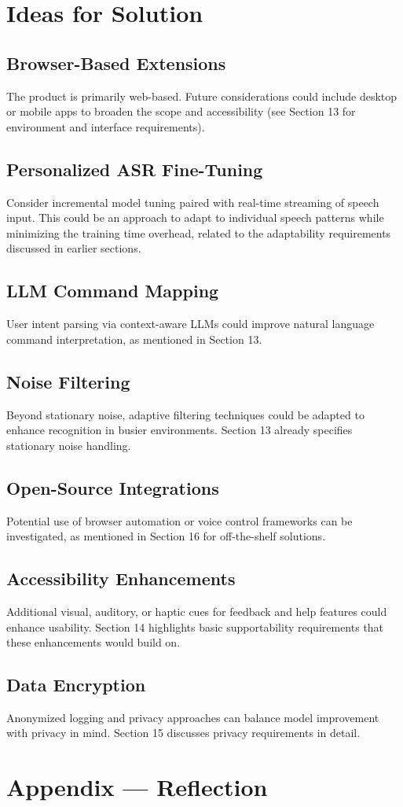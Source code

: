 \documentclass[12pt]{article}
\begin{document}
\section{Ideas for Solution}

\subsection{Browser-Based Extensions}
The product is primarily web-based. Future considerations could include desktop or mobile apps to broaden the scope and accessibility (see Section 13 for environment and interface requirements).

\subsection{Personalized ASR Fine-Tuning}
Consider incremental model tuning paired with real-time streaming of speech input. This could be an approach to adapt to individual speech patterns while minimizing the training time overhead, related to the adaptability requirements discussed in earlier sections.

\subsection{LLM Command Mapping}
User intent parsing via context-aware LLMs could improve natural language command interpretation, as mentioned in Section 13.

\subsection{Noise Filtering}
Beyond stationary noise, adaptive filtering techniques could be adapted to enhance recognition in busier environments. Section 13 already specifies stationary noise handling.

\subsection{Open-Source Integrations}
Potential use of browser automation or voice control frameworks can be investigated, as mentioned in Section 16 for off-the-shelf solutions.

\subsection{Accessibility Enhancements}
Additional visual, auditory, or haptic cues for feedback and help features could enhance usability. Section 14 highlights basic supportability requirements that these enhancements would build on.

\subsection{Data Encryption}
Anonymized logging and privacy approaches can balance model improvement with privacy in mind. Section 15 discusses privacy requirements in detail.


\newpage{}
\section*{Appendix --- Reflection}




\end{document}
